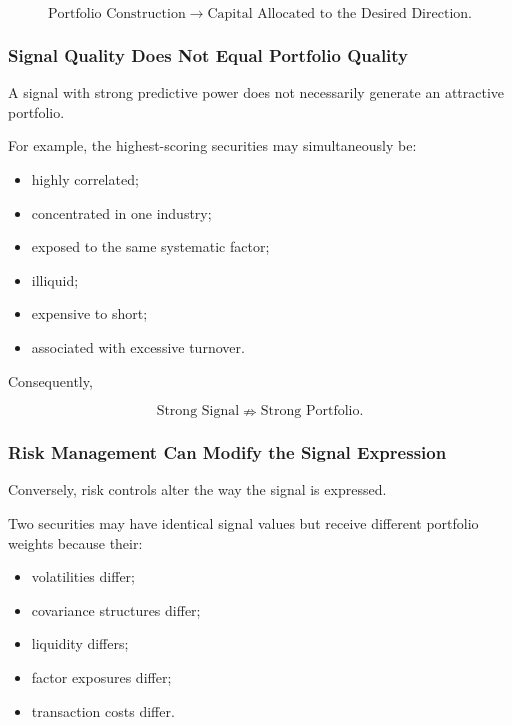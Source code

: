 \documentclass[11pt,a4paper]{article}
\begin{document}
\begin{equation}
\boxed{
\text{Portfolio Construction}
\rightarrow
\text{Capital Allocated to the Desired Direction}.
}
\end{equation}


\subsubsection{Signal Quality Does Not Equal Portfolio Quality}

A signal with strong predictive power does not necessarily generate an
attractive portfolio.

For example, the highest-scoring securities may simultaneously be:

\begin{itemize}
    \item highly correlated;
    \item concentrated in one industry;
    \item exposed to the same systematic factor;
    \item illiquid;
    \item expensive to short;
    \item associated with excessive turnover.
\end{itemize}

Consequently,

\begin{equation}
\boxed{
\text{Strong Signal}
\nRightarrow
\text{Strong Portfolio}.
}
\end{equation}


\subsubsection{Risk Management Can Modify the Signal Expression}

Conversely, risk controls alter the way the signal is expressed.

Two securities may have identical signal values but receive different portfolio
weights because their:

\begin{itemize}
    \item volatilities differ;
    \item covariance structures differ;
    \item liquidity differs;
    \item factor exposures differ;
    \item transaction costs differ.
\end{itemize}
\end{document}

